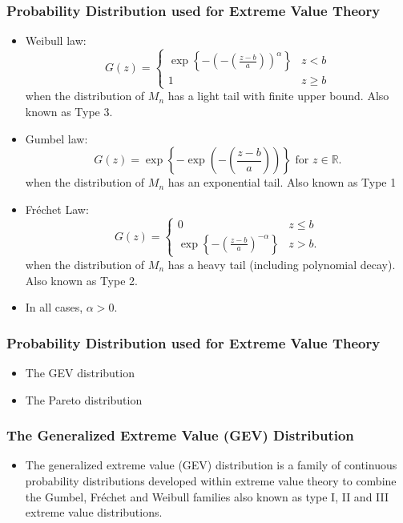 \documentclass[MAIN.tex]{subfiles}
\begin{document}
 
\begin{frame}
	\frametitle{Probability Distribution used for Extreme Value Theory}
		
	\begin{itemize}
		\item Weibull law: \[ G(z) = \begin{cases} \exp\left\{-\left( -\left( \frac{z-b}{a} \right) \right)^\alpha\right\} & z<b \\ 1 & z\geq b \end{cases} \] when the distribution of $M_n$ has a light tail with finite upper bound. Also known as Type 3.
		\item Gumbel law:  
		\[G(z) = \exp\left\{-\exp\left(-\left(\frac{z-b}{a}\right)\right)\right\}\text{ for }z\in\mathbb R.\] when the distribution of $M_n$ has an exponential tail. Also known as Type 1
		\item Fréchet Law:  \[G(z) = \begin{cases} 0 & z\leq b \\ \exp\left\{-\left(\frac{z-b}{a}\right)^{-\alpha}\right\} & z>b. \end{cases} \] when the distribution of $M_n$ has a heavy tail (including polynomial decay). Also known as Type 2.
		\item In all cases, $\alpha>0$.
	\end{itemize}
\end{frame}	
\begin{frame}
\frametitle{Probability Distribution used for Extreme Value Theory}
\begin{itemize}
\item The GEV distribution
\item The Pareto distribution
\end{itemize}

\end{frame}
\begin{frame}
\frametitle{The Generalized Extreme Value (GEV) Distribution}
\begin{itemize}
\item The generalized extreme value (GEV) distribution is a family of continuous probability distributions developed within extreme value theory to combine the Gumbel, Fréchet and Weibull families also known as type I, II and III extreme value distributions.
\end{itemize}
\end{frame}
\end{document}
